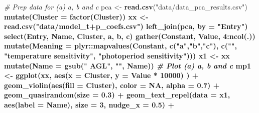 \documentclass[
]{article}
\newenvironment{Shaded}{\begin{snugshade}}{\end{snugshade}}
\newcommand{\CommentTok}[1]{\textcolor[rgb]{0.56,0.35,0.01}{\textit{#1}}}
\newcommand{\DataTypeTok}[1]{\textcolor[rgb]{0.13,0.29,0.53}{#1}}
\newcommand{\DecValTok}[1]{\textcolor[rgb]{0.00,0.00,0.81}{#1}}
\newcommand{\FloatTok}[1]{\textcolor[rgb]{0.00,0.00,0.81}{#1}}
\newcommand{\KeywordTok}[1]{\textcolor[rgb]{0.13,0.29,0.53}{\textbf{#1}}}
\newcommand{\NormalTok}[1]{#1}
\newcommand{\OperatorTok}[1]{\textcolor[rgb]{0.81,0.36,0.00}{\textbf{#1}}}
\newcommand{\OtherTok}[1]{\textcolor[rgb]{0.56,0.35,0.01}{#1}}
\newcommand{\StringTok}[1]{\textcolor[rgb]{0.31,0.60,0.02}{#1}}
\begin{document}
\begin{Shaded}
\begin{Highlighting}[]
\CommentTok{# Prep data for (a) a, b and c}
\NormalTok{pca <-}\StringTok{ }\KeywordTok{read.csv}\NormalTok{(}\StringTok{"data/data_pca_results.csv"}\NormalTok{) }\OperatorTok{%
\StringTok{  }\KeywordTok{mutate}\NormalTok{(}\DataTypeTok{Cluster =} \KeywordTok{factor}\NormalTok{(Cluster))}
\NormalTok{xx <-}\StringTok{ }\KeywordTok{read.csv}\NormalTok{(}\StringTok{"data/model_t+p_coefs.csv"}\NormalTok{) }\OperatorTok{%
\StringTok{  }\KeywordTok{left_join}\NormalTok{(pca, }\DataTypeTok{by =} \StringTok{"Entry"}\NormalTok{) }\OperatorTok{%
\StringTok{  }\KeywordTok{select}\NormalTok{(Entry, Name, Cluster, a, b, c) }\OperatorTok{%
\StringTok{  }\KeywordTok{gather}\NormalTok{(Constant, Value, }\DecValTok{4}\OperatorTok{:}\KeywordTok{ncol}\NormalTok{(.)) }\OperatorTok{%
\StringTok{  }\KeywordTok{mutate}\NormalTok{(}\DataTypeTok{Meaning =}\NormalTok{ plyr}\OperatorTok{::}\KeywordTok{mapvalues}\NormalTok{(Constant, }\KeywordTok{c}\NormalTok{(}\StringTok{"a"}\NormalTok{,}\StringTok{"b"}\NormalTok{,}\StringTok{"c"}\NormalTok{),}
           \KeywordTok{c}\NormalTok{(}\StringTok{""}\NormalTok{, }\StringTok{"temperature sensitivity"}\NormalTok{, }\StringTok{"photoperiod sensitivity"}\NormalTok{)))}
\NormalTok{x1 <-}\StringTok{ }\NormalTok{xx }\OperatorTok{%
\StringTok{  }\KeywordTok{mutate}\NormalTok{(}\DataTypeTok{Name =} \KeywordTok{gsub}\NormalTok{(}\StringTok{" AGL"}\NormalTok{, }\StringTok{""}\NormalTok{, Name))}
\CommentTok{# Plot (a) a, b and c}
\NormalTok{mp1 <-}\StringTok{ }\KeywordTok{ggplot}\NormalTok{(xx, }\KeywordTok{aes}\NormalTok{(}\DataTypeTok{x =}\NormalTok{ Cluster, }\DataTypeTok{y =}\NormalTok{ Value }\OperatorTok{*}\StringTok{ }\DecValTok{10000}\NormalTok{) ) }\OperatorTok{+}\StringTok{ }
\StringTok{  }\KeywordTok{geom_violin}\NormalTok{(}\KeywordTok{aes}\NormalTok{(}\DataTypeTok{fill =}\NormalTok{ Cluster), }\DataTypeTok{color =} \OtherTok{NA}\NormalTok{, }\DataTypeTok{alpha =} \FloatTok{0.7}\NormalTok{) }\OperatorTok{+}\StringTok{ }
\StringTok{  }\KeywordTok{geom_quasirandom}\NormalTok{(}\DataTypeTok{size =} \FloatTok{0.3}\NormalTok{) }\OperatorTok{+}\StringTok{ }
\StringTok{  }\KeywordTok{geom_text_repel}\NormalTok{(}\DataTypeTok{data =}\NormalTok{ x1, }\KeywordTok{aes}\NormalTok{(}\DataTypeTok{label =}\NormalTok{ Name), }\DataTypeTok{size =} \DecValTok{3}\NormalTok{, }\DataTypeTok{nudge_x =} \FloatTok{0.5}\NormalTok{) }\OperatorTok{+}
}}}}}}
\end{Highlighting}
\end{Shaded}
\end{document}
